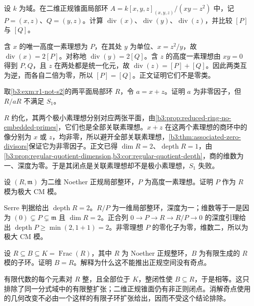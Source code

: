 \begin{exercise}\label{b3:ex:20-quadric-three-divisors}
	设 \(k\) 为域。在二维正规锥面局部环 \(A=k[x,y,z]_{(x,y,z)}/(xy-z^2)\) 中，记 \(P=(x,z)\)、\(Q=(y,z)\)。计算 \(\operatorname{div}(x)\)、\(\operatorname{div}(y)\)、\(\operatorname{div}(z)\)，并比较 \([P]\) 与 \([Q]\)。
\end{exercise}
\begin{solution}
	含 \(x\) 的唯一高度一素理想为 \(P\)，在其处 \(y\) 为单位、\(x=z^2/y\)，故 \(\operatorname{div}(x)=2[P]\)。对称地 \(\operatorname{div}(y)=2[Q]\)。含 \(z\) 的高度一素理想由 \(xy=0\) 得到 \(P,Q\)，且 \(z\) 在两处都是统一化元，故 \(\operatorname{div}(z)=[P]+[Q]\)。因此两类互为逆，而各自二倍为零，所以 \([P]=[Q]\)。正文证明它们不是零类。
\end{solution}

\begin{exercise}\label{b3:ex:20-regular-quotient-loses-s1}
	取\cref{b3:exm:r1-not-s2}的两平面局部环 \(R\)，令 \(a=x+z\)。证明 \(a\) 为非零因子，但 \(R/aR\) 不满足 \(S_1\)。
\end{exercise}
\begin{solution}
	\(R\) 约化，其两个极小素理想分别对应两张平面，由\cref{b3:prop:reduced-ring-no-embedded-primes}，它们也是全部关联素理想。\(x+z\) 在这两个素理想的商环中的像分别为 \(x\) 或 \(z\)，均非零，所以避开全部关联素理想，\cref{b3:thm:associated-zero-divisors}保证它为非零因子。正文已得 \(\dim R=2\)、\(\operatorname{depth}R=1\)，由\cref{b3:prop:regular-quotient-dimension,b3:cor:regular-quotient-depth}，商的维数为一、深度为零。于是其闭点是关联素理想却不是极小素理想，\(S_1\) 失败。
\end{solution}

\begin{exercise}\label{b3:ex:20-height-one-ideal-cm}
	设 \((R,\mathfrak m)\) 为二维 Noether 正规局部整环，\(P\) 为高度一素理想。证明 \(P\) 作为 \(R\) 模为极大 CM 模。
\end{exercise}
\begin{solution}
	Serre 判据给出 \(\operatorname{depth}R=2\)。\(R/P\) 为一维局部整环，深度为一；维数等于一是因为 \((0)\subsetneq P\subsetneq\mathfrak m\) 且 \(\dim R=2\)。正合列 \(0\to P\to R\to R/P\to0\) 的深度引理给出 \(\operatorname{depth}P\ge\min(2,1+1)=2\)。非零理想 \(P\) 的零化子为零，维数二，所以为极大 CM 模。
\end{solution}

\begin{exercise}\label{b3:ex:20-normal-birational-finite}
	设 \(R\subseteq B\subseteq K=\operatorname{Frac}(R)\)，其中 \(R\) 为 Noether 正规整环，\(B\) 为有限生成的 \(R\) 模的子环。证明 \(B=R\)。解释为什么这不能推出正规空间没有奇点。
\end{exercise}
\begin{solution}
	有限代数的每个元素对 \(R\) 整，且全部位于 \(K\)，整闭性使 \(B\subseteq R\)，于是相等。这只排除了同一分式域中的有限整扩张；二维正规锥面仍有非正则闭点。消解奇点使用的几何改变不必由一个这样的有限子环扩张给出，因而不受这个结论排除。
\end{solution}

